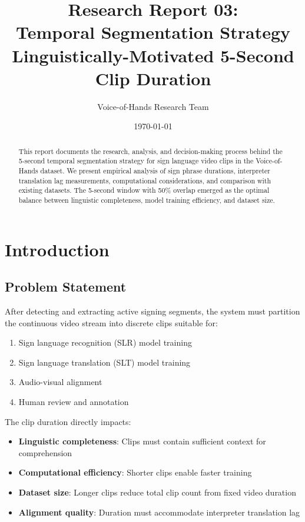\documentclass[11pt,a4paper]{article}
\title{\textbf{Research Report 03:}\\Temporal Segmentation Strategy\\Linguistically-Motivated 5-Second Clip Duration}
\author{Voice-of-Hands Research Team}
\date{\today}
\begin{document}
\maketitle

\begin{abstract}
This report documents the research, analysis, and decision-making process behind the 5-second temporal segmentation strategy for sign language video clips in the Voice-of-Hands dataset. We present empirical analysis of sign phrase durations, interpreter translation lag measurements, computational considerations, and comparison with existing datasets. The 5-second window with 50\% overlap emerged as the optimal balance between linguistic completeness, model training efficiency, and dataset size.
\end{abstract}

\tableofcontents
\newpage

\section{Introduction}

\subsection{Problem Statement}

After detecting and extracting active signing segments, the system must partition the continuous video stream into discrete clips suitable for:
\begin{enumerate}
    \item Sign language recognition (SLR) model training
    \item Sign language translation (SLT) model training
    \item Audio-visual alignment
    \item Human review and annotation
\end{enumerate}

The clip duration directly impacts:
\begin{itemize}
    \item \textbf{Linguistic completeness}: Clips must contain sufficient context for comprehension
    \item \textbf{Computational efficiency}: Shorter clips enable faster training
    \item \textbf{Dataset size}: Longer clips reduce total clip count from fixed video duration
    \item \textbf{Alignment quality}: Duration must accommodate interpreter translation lag
\end{itemize}
\end{document}
